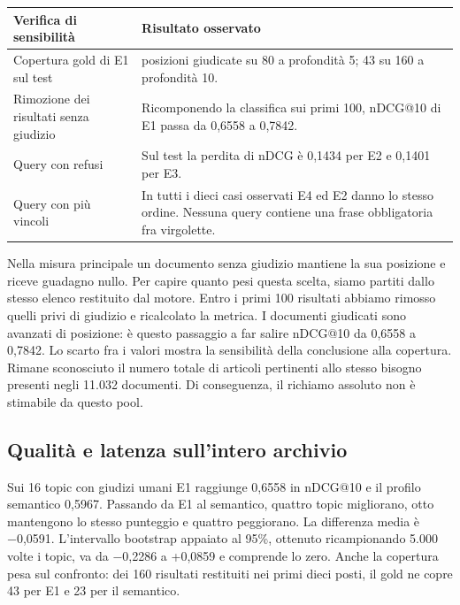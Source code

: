 \documentclass[11pt,a4paper]{article}
\newcounter{none}
\begin{document}
{\def\LTcaptype{none} %
\begin{longtable}[]{@{}
  >{\raggedright\arraybackslash}p{}
  >{\raggedright\arraybackslash}p{}@{}}
\toprule\noalign{}
\begin{minipage}[b]{\linewidth}\raggedright
Verifica di sensibilità
\end{minipage} & \begin{minipage}[b]{\linewidth}\raggedright
Risultato osservato
\end{minipage} \\
\midrule\noalign{}
\endhead
\bottomrule\noalign{}
\endlastfoot
Copertura gold di E1 sul test & 31 posizioni giudicate su 80 a profondità 5; 43 su 160 a profondità 10. \\
Rimozione dei risultati senza giudizio & Ricomponendo la classifica sui primi 100, nDCG@10 di E1 passa da 0,6558 a 0,7842. \\
Query con refusi & Sul test la perdita di nDCG è 0,1434 per E2 e 0,1401 per E3. \\
Query con più vincoli & In tutti i dieci casi osservati E4 ed E2 danno lo stesso ordine. Nessuna query contiene una frase obbligatoria fra virgolette. \\
\end{longtable}
}

Nella misura principale un documento senza giudizio mantiene la sua posizione e riceve guadagno nullo. Per capire quanto pesi questa scelta, siamo partiti dallo stesso elenco restituito dal motore. Entro i primi 100 risultati abbiamo rimosso quelli privi di giudizio e ricalcolato la metrica. I documenti giudicati sono avanzati di posizione: è questo passaggio a far salire nDCG@10 da 0,6558 a 0,7842. Lo scarto fra i valori mostra la sensibilità della conclusione alla copertura. Rimane sconosciuto il numero totale di articoli pertinenti allo stesso bisogno presenti negli 11.032 documenti. Di conseguenza, il richiamo assoluto non è stimabile da questo pool.

\clearpage

\subsection{Qualità e latenza sull'intero archivio}\label{qualituxe0-e-latenza-sullintero-archivio}

Sui 16 topic con giudizi umani E1 raggiunge 0,6558 in nDCG@10 e il profilo semantico 0,5967. Passando da E1 al semantico, quattro topic migliorano, otto mantengono lo stesso punteggio e quattro peggiorano. La differenza media è −0,0591. L'intervallo bootstrap appaiato al 95\%, ottenuto ricampionando 5.000 volte i topic, va da −0,2286 a +0,0859 e comprende lo zero. Anche la copertura pesa sul confronto: dei 160 risultati restituiti nei primi dieci posti, il gold ne copre 43 per E1 e 23 per il semantico.
\end{document}
